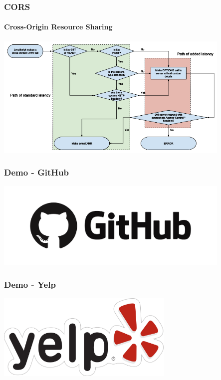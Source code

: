\documentclass[dvipsnames]{beamer}
\begin{document}
\begin{frame}
  \frametitle{CORS}
  \framesubtitle{Cross-Origin Resource Sharing}
  \begin{center}
    \includegraphics[width=320pt]{img/cors-diagram.png}
  \end{center}
\end{frame}


\begin{frame}
  \frametitle{Demo - GitHub}
  \begin{center}
    \includegraphics[width=320pt]{img/github-logo.png}
  \end{center}
\end{frame}


\begin{frame}
  \frametitle{Demo - Yelp}
  \begin{center}
    \includegraphics[width=240pt]{img/yelp-logo.png}
  \end{center}
\end{frame}
\end{document}
